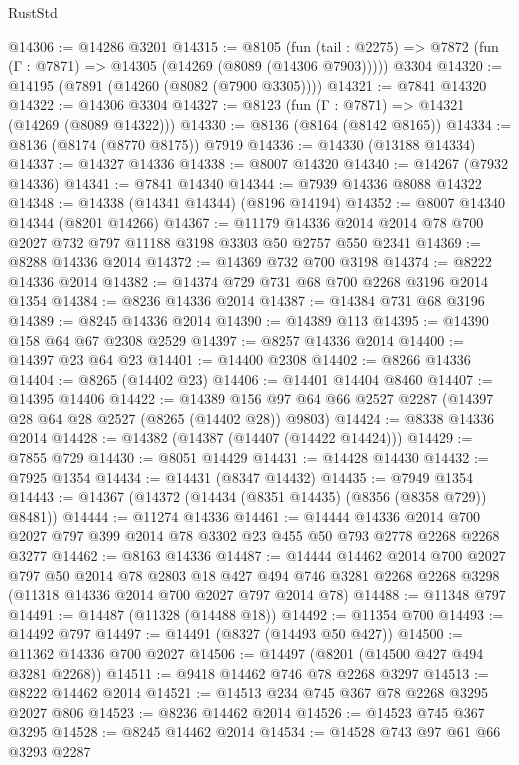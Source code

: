 \begin{lexlean}{RustStd}
\begin{coremodule}
@14306 := @14286 @3201
@14315 := @8105
    (fun (tail : @2275) => @7872 (fun (Γ : @7871) => @14305 (@14269 (@8089 (@14306 @7903)))))
    @3304
@14320 := @14195 (@7891 (@14260 (@8082 (@7900 @3305))))
@14321 := @7841 @14320
@14322 := @14306 @3304
@14327 := @8123 (fun (Γ : @7871) => @14321 (@14269 (@8089 @14322)))
@14330 := @8136 (@8164 (@8142 @8165))
@14334 := @8136 (@8174 (@8770 @8175)) @7919
@14336 := @14330 (@13188 @14334)
@14337 := @14327 @14336
@14338 := @8007 @14320
@14340 := @14267 (@7932 @14336)
@14341 := @7841 @14340
@14344 := @7939 @14336 @8088 @14322
@14348 := @14338 (@14341 @14344) (@8196 @14194)
@14352 := @8007 @14340 @14344 (@8201 @14266)
@14367 := @11179 @14336 @2014 @2014 @78 @700 @2027 @732 @797 @11188 @3198 @3303 @50 @2757 @550 @2341
@14369 := @8288 @14336 @2014
@14372 := @14369 @732 @700 @3198
@14374 := @8222 @14336 @2014
@14382 := @14374 @729 @731 @68 @700 @2268 @3196 @2014 @1354
@14384 := @8236 @14336 @2014
@14387 := @14384 @731 @68 @3196
@14389 := @8245 @14336 @2014
@14390 := @14389 @113
@14395 := @14390 @158 @64 @67 @2308 @2529
@14397 := @8257 @14336 @2014
@14400 := @14397 @23 @64 @23
@14401 := @14400 @2308
@14402 := @8266 @14336
@14404 := @8265 (@14402 @23)
@14406 := @14401 @14404 @8460
@14407 := @14395 @14406
@14422 := @14389 @156 @97 @64 @66 @2527 @2287 (@14397 @28 @64 @28 @2527 (@8265 (@14402 @28)) @9803)
@14424 := @8338 @14336 @2014
@14428 := @14382 (@14387 (@14407 (@14422 @14424)))
@14429 := @7855 @729
@14430 := @8051 @14429
@14431 := @14428 @14430
@14432 := @7925 @1354
@14434 := @14431 (@8347 @14432)
@14435 := @7949 @1354
@14443 := @14367 (@14372 (@14434 (@8351 @14435) (@8356 (@8358 @729)) @8481))
@14444 := @11274 @14336
@14461 := @14444
    @14336
    @2014
    @700
    @2027
    @797
    @399
    @2014
    @78
    @3302
    @23
    @455
    @50
    @793
    @2778
    @2268
    @2268
    @3277
@14462 := @8163 @14336
@14487 := @14444
    @14462
    @2014
    @700
    @2027
    @797
    @50
    @2014
    @78
    @2803
    @18
    @427
    @494
    @746
    @3281
    @2268
    @2268
    @3298
    (@11318 @14336 @2014 @700 @2027 @797 @2014 @78)
@14488 := @11348 @797
@14491 := @14487 (@11328 (@14488 @18))
@14492 := @11354 @700
@14493 := @14492 @797
@14497 := @14491 (@8327 (@14493 @50 @427))
@14500 := @11362 @14336 @700 @2027
@14506 := @14497 (@8201 (@14500 @427 @494 @3281 @2268))
@14511 := @9418 @14462 @746 @78 @2268 @3297
@14513 := @8222 @14462 @2014
@14521 := @14513 @234 @745 @367 @78 @2268 @3295 @2027 @806
@14523 := @8236 @14462 @2014
@14526 := @14523 @745 @367 @3295
@14528 := @8245 @14462 @2014
@14534 := @14528 @743 @97 @61 @66 @3293 @2287

\end{coremodule}
\end{lexlean}
